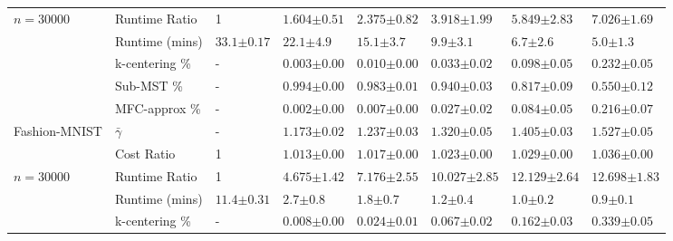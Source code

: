 \begin{table}[t!]
{\begin{tabular}{ llllllll }
			$ n=30000$ & Runtime Ratio & 1 & $ 1.604  \scriptstyle{ \pm  0.51  } $ & $ 2.375  \scriptstyle{ \pm  0.82  } $ & $ 3.918  \scriptstyle{ \pm  1.99  } $ & $ 5.849  \scriptstyle{ \pm  2.83  } $ & $ 7.026  \scriptstyle{ \pm  1.69  } $ \\
			& Runtime (mins) & $33.1 \scriptstyle{ \pm 0.17 } $ & $ 22.1  \scriptstyle{ \pm  4.9  } $ & $ 15.1  \scriptstyle{ \pm  3.7  } $ & $ 9.9  \scriptstyle{ \pm  3.1  } $ & $ 6.7  \scriptstyle{ \pm  2.6  } $ & $ 5.0  \scriptstyle{ \pm  1.3  } $ \\
			& k-centering \% & - & $ 0.003  \scriptstyle{ \pm  0.00  } $ & $ 0.010  \scriptstyle{ \pm  0.00  } $ & $ 0.033  \scriptstyle{ \pm  0.02  } $ & $ 0.098  \scriptstyle{ \pm  0.05  } $ & $ 0.232  \scriptstyle{ \pm  0.05  } $ \\
			& Sub-MST \% & - & $ 0.994  \scriptstyle{ \pm  0.00  } $ & $ 0.983  \scriptstyle{ \pm  0.01  } $ & $ 0.940  \scriptstyle{ \pm  0.03  } $ & $ 0.817  \scriptstyle{ \pm  0.09  } $ & $ 0.550  \scriptstyle{ \pm  0.12  } $ \\
			& MFC-approx \% & - & $ 0.002  \scriptstyle{ \pm  0.00  } $ & $ 0.007  \scriptstyle{ \pm  0.00  } $ & $ 0.027  \scriptstyle{ \pm  0.02  } $ & $ 0.084  \scriptstyle{ \pm  0.05  } $ & $ 0.216  \scriptstyle{ \pm  0.07  } $ \\
			\cmidrule(lr){1-8}
			Fashion-MNIST & $ \bar{\gamma} $ & - & $ 1.173  \scriptstyle{ \pm  0.02  } $ & $ 1.237  \scriptstyle{ \pm  0.03  } $ & $ 1.320  \scriptstyle{ \pm  0.05  } $ & $ 1.405  \scriptstyle{ \pm  0.03  } $ & $ 1.527  \scriptstyle{ \pm  0.05  } $ \\
			& Cost Ratio & 1 & $ 1.013  \scriptstyle{ \pm  0.00  } $ & $ 1.017  \scriptstyle{ \pm  0.00  } $ & $ 1.023  \scriptstyle{ \pm  0.00  } $ & $ 1.029  \scriptstyle{ \pm  0.00  } $ & $ 1.036  \scriptstyle{ \pm  0.00  } $ \\
			$ n=30000$ & Runtime Ratio & 1 & $ 4.675  \scriptstyle{ \pm  1.42  } $ & $ 7.176  \scriptstyle{ \pm  2.55  } $ & $ 10.027  \scriptstyle{ \pm  2.85  } $ & $ 12.129  \scriptstyle{ \pm  2.64  } $ & $ 12.698  \scriptstyle{ \pm  1.83  } $ \\
			& Runtime (mins) & $11.4 \scriptstyle{ \pm 0.31 } $ & $ 2.7  \scriptstyle{ \pm  0.8  } $ & $ 1.8  \scriptstyle{ \pm  0.7  } $ & $ 1.2  \scriptstyle{ \pm  0.4  } $ & $ 1.0  \scriptstyle{ \pm  0.2  } $ & $ 0.9  \scriptstyle{ \pm  0.1  } $ \\
			& k-centering \% & - & $ 0.008  \scriptstyle{ \pm  0.00  } $ & $ 0.024  \scriptstyle{ \pm  0.01  } $ & $ 0.067  \scriptstyle{ \pm  0.02  } $ & $ 0.162  \scriptstyle{ \pm  0.03  } $ & $ 0.339  \scriptstyle{ \pm  0.05  } $ \\

\end{tabular}}
\end{table}
